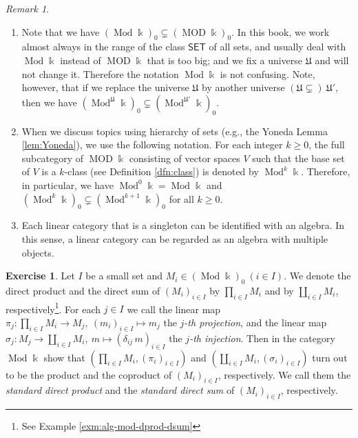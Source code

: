 \documentclass{surv-l}
\numberwithin{equation}{chapter}
\numberwithin{figure}{chapter}
\theoremstyle{plain}
\theoremstyle{definition}
\newtheorem{exc}[thm]{Exercise}
\theoremstyle{remark}
\newtheorem{rmk}[thm]{Remark}
\DeclareMathOperator{\Mod}{Mod}
\DeclareMathOperator{\MOD}{MOD}
\begin{document}
\begin{rmk}\leavevmode
\label{rmk:hier}
\begin{enumerate}
\item
Note that we have $(\Mod \Bbbk)_0 \subsetneq (\MOD \Bbbk)_0$.
In this book,
we work almost always in the range of the class $\mathsf{SET}$ of all sets,
and usually deal with $\Mod \Bbbk$ instead of $\MOD \Bbbk$ that is too big;
and we fix a universe $\mathfrak{U}$ and will not change it.
Therefore the notation $\Mod \Bbbk$ is not confusing.
Note, however, that if we replace the universe $\mathfrak{U}$ by another universe
$(\mathfrak{U} \subsetneq)\ \mathfrak{U}'$, then we have
$(\Mod^\mathfrak{U} \Bbbk)_0 \subsetneq (\Mod^{\mathfrak{U}'} \Bbbk)_0$.

\item
When we discuss topics using hierarchy of sets (e.g., the Yoneda Lemma \ref{lem:Yoneda}),
we use the following notation.
For each integer $k \ge 0$, the full subcategory of $\MOD \Bbbk$ consisting of
vector spaces $V$ such that the base set of $V$ is a $k$-class (see Definition \ref{dfn:class})
is denoted by $\Mod^k \Bbbk$.
Therefore, in particular, we have $\Mod^0 \Bbbk = \Mod \Bbbk$ and
$(\Mod^k \Bbbk)_0 \subsetneq (\Mod^{k+1} \Bbbk)_0$ for all $k \ge 0$.
\item
Each linear category that is a singleton can be identified with an algebra.
In this sense, a linear category can be regarded as an algebra with multiple objects.
\end{enumerate}
\end{rmk}

\begin{exc}
Let $I$ be a small set and $M_i \in (\Mod\Bbbk)_0 \ (i\in I)$.
We denote the direct product and the direct sum of $(M_i)_{i\in I}$ by
$\prod_{i\in I}M_i$ and by $\coprod_{i\in I}M_i$, respectively\footnote{See Example \ref{exm:alg-mod-dprod-dsum}}.
For each $j \in I$ we call the linear map $\pi_j\colon \prod_{i \in I} M_i \to M_j, \ (m_i)_{i\in I} \mapsto m_j$
the \emph{$j$-th projection}, and
the linear map $\sigma_j\colon M_j \to \coprod_{i \in I} M_i, \ m \mapsto (\delta_{ij}\, m)_{i\in I} $
the \emph{$j$-th injection}.
Then in the category $\Mod\Bbbk$ show that
$(\prod_{i\in I}M_i, (\pi_i)_{i\in I})$ and $(\coprod_{i\in I}M_i, (\sigma_i)_{i\in I})$ turn out to be
the product and the coproduct of $(M_i)_{i\in I}$, respectively.
We call them the {\em standard direct product} and the {\em standard direct sum} of
$(M_i)_{i\in I}$, respectively.
\end{exc}
\end{document}
